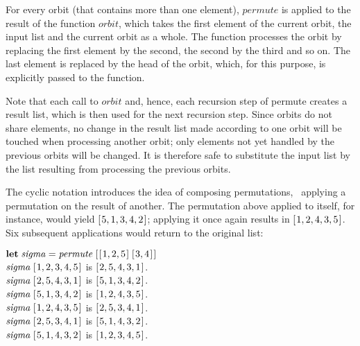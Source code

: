 \documentclass{scrreprt}
\newcommand{\Varid}[1]{\mathit{#1}}
\begin{document}
For every orbit (that contains more than one element),
$permute$ is applied to the result of the function $orbit$,
which takes the first element of the current orbit,
the input list and the current orbit as a whole.
The function processes the orbit by replacing
the first element by the second,
the second by the third and so on.
The last element is replaced by the head of the orbit,
which, for this purpose, is explicitly passed to the function. 

Note that each call to $orbit$ 
and, hence, each recursion step of permute
creates a result list, which is then used
for the next recursion step.
Since orbits do not share elements,
no change in the result list made according to one orbit
will be touched when processing another orbit;
only elements not yet handled by the previous orbits
will be changed.
It is therefore safe to substitute the input list
by the list resulting from processing the previous orbits.

The cyclic notation introduces the idea
of composing permutations,
\ie\ applying a permutation on the result
of another.
The permutation above applied to itself,
for instance,
would yield \ensuremath{[\mskip1.5mu \mathrm{5},\mathrm{1},\mathrm{3},\mathrm{4},\mathrm{2}\mskip1.5mu]};
applying it once again results in \ensuremath{[\mskip1.5mu \mathrm{1},\mathrm{2},\mathrm{4},\mathrm{3},\mathrm{5}\mskip1.5mu]}.
Six subsequent applications would 
return to the original list:

\ensuremath{\mathbf{let}\;\Varid{sigma}\mathrel{=}\Varid{permute}\;[\mskip1.5mu [\mskip1.5mu \mathrm{1},\mathrm{2},\mathrm{5}\mskip1.5mu]\;[\mskip1.5mu \mathrm{3},\mathrm{4}\mskip1.5mu]\mskip1.5mu]}\\
\ensuremath{\Varid{sigma}\;[\mskip1.5mu \mathrm{1},\mathrm{2},\mathrm{3},\mathrm{4},\mathrm{5}\mskip1.5mu]} is \ensuremath{[\mskip1.5mu \mathrm{2},\mathrm{5},\mathrm{4},\mathrm{3},\mathrm{1}\mskip1.5mu]}.\\
\ensuremath{\Varid{sigma}\;[\mskip1.5mu \mathrm{2},\mathrm{5},\mathrm{4},\mathrm{3},\mathrm{1}\mskip1.5mu]} is \ensuremath{[\mskip1.5mu \mathrm{5},\mathrm{1},\mathrm{3},\mathrm{4},\mathrm{2}\mskip1.5mu]}.\\
\ensuremath{\Varid{sigma}\;[\mskip1.5mu \mathrm{5},\mathrm{1},\mathrm{3},\mathrm{4},\mathrm{2}\mskip1.5mu]} is \ensuremath{[\mskip1.5mu \mathrm{1},\mathrm{2},\mathrm{4},\mathrm{3},\mathrm{5}\mskip1.5mu]}.\\
\ensuremath{\Varid{sigma}\;[\mskip1.5mu \mathrm{1},\mathrm{2},\mathrm{4},\mathrm{3},\mathrm{5}\mskip1.5mu]} is \ensuremath{[\mskip1.5mu \mathrm{2},\mathrm{5},\mathrm{3},\mathrm{4},\mathrm{1}\mskip1.5mu]}.\\
\ensuremath{\Varid{sigma}\;[\mskip1.5mu \mathrm{2},\mathrm{5},\mathrm{3},\mathrm{4},\mathrm{1}\mskip1.5mu]} is \ensuremath{[\mskip1.5mu \mathrm{5},\mathrm{1},\mathrm{4},\mathrm{3},\mathrm{2}\mskip1.5mu]}.\\
\ensuremath{\Varid{sigma}\;[\mskip1.5mu \mathrm{5},\mathrm{1},\mathrm{4},\mathrm{3},\mathrm{2}\mskip1.5mu]} is \ensuremath{[\mskip1.5mu \mathrm{1},\mathrm{2},\mathrm{3},\mathrm{4},\mathrm{5}\mskip1.5mu]}.
\end{document}
